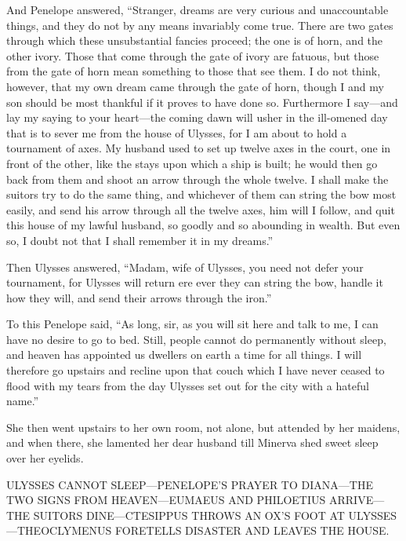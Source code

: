 And Penelope answered, “Stranger, dreams are very curious and unaccountable
things, and they do not by any means invariably come true. There are two gates
through which these unsubstantial fancies proceed; the one is of horn, and the
other ivory. Those that come through the gate of ivory are fatuous, but those
from the gate of horn mean something to those that see them. I do not think,
however, that my own dream came through the gate of horn, though I and my son
should be most thankful if it proves to have done so. Furthermore I say—and lay
my saying to your heart—the coming dawn will usher in the ill-omened day that
is to sever me from the house of Ulysses, for I am about to hold a tournament
of axes. My husband used to set up twelve axes in the court, one in front of
the other, like the stays upon which a ship is built; he would then go back
from them and shoot an arrow through the whole twelve. I shall make the suitors
try to do the same thing, and whichever of them can string the bow most easily,
and send his arrow through all the twelve axes, him will I follow, and quit
this house of my lawful husband, so goodly and so abounding in wealth. But even
so, I doubt not that I shall remember it in my dreams.”

Then Ulysses answered, “Madam, wife of Ulysses, you need not defer your
tournament, for Ulysses will return ere ever they can string the bow, handle it
how they will, and send their arrows through the iron.”

To this Penelope said, “As long, sir, as you will sit here and talk to me, I
can have no desire to go to bed. Still, people cannot do permanently without
sleep, and heaven has appointed us dwellers on earth a time for all things. I
will therefore go upstairs and recline upon that couch which I have never
ceased to flood with my tears from the day Ulysses set out for the city with a
hateful name.”

She then went upstairs to her own room, not alone, but attended by her maidens,
and when there, she lamented her dear husband till Minerva shed sweet sleep
over her eyelids.


ULYSSES CANNOT SLEEP—PENELOPE’S PRAYER TO DIANA—THE TWO SIGNS FROM
HEAVEN—EUMAEUS AND PHILOETIUS ARRIVE—THE SUITORS DINE—CTESIPPUS THROWS AN OX’S
FOOT AT ULYSSES—THEOCLYMENUS FORETELLS DISASTER AND LEAVES THE HOUSE.

